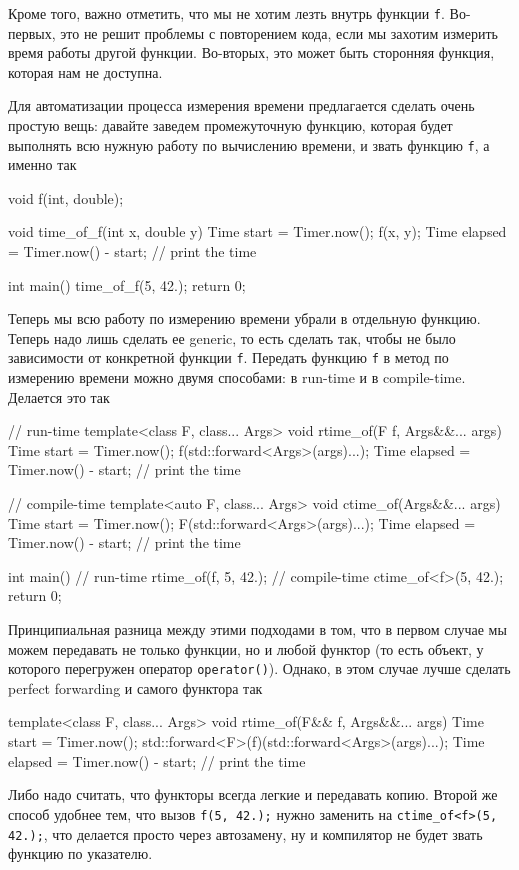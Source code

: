 Кроме того, важно отметить, что мы не хотим лезть внутрь функции \verb"f".
Во-первых, это не решит проблемы с повторением кода, если мы захотим измерить время работы другой функции.
Во-вторых, это может быть сторонняя функция, которая нам не доступна.

Для автоматизации процесса измерения времени предлагается сделать очень простую вещь: давайте заведем промежуточную функцию, которая будет выполнять всю нужную работу по вычислению времени, и звать функцию \verb"f", а именно так
\begin{cppcode}
void f(int, double);

void time_of_f(int x, double y) {
  Time start = Timer.now();
  f(x, y);
  Time elapsed = Timer.now() - start;
  // print the time
}

int main() {
  time_of_f(5, 42.);
  return 0;
}
\end{cppcode}
Теперь мы всю работу по измерению времени убрали в отдельную функцию.
Теперь надо лишь сделать ее generic, то есть сделать так, чтобы не было зависимости от конкретной функции \verb"f".
Передать функцию \verb"f" в метод по измерению времени можно двумя способами: в run-time и в compile-time.
Делается это так
\begin{cppcode}
// run-time
template<class F, class... Args>
void rtime_of(F f, Args&&... args) {
  Time start = Timer.now();
  f(std::forward<Args>(args)...);
  Time elapsed = Timer.now() - start;
  // print the time
}

// compile-time
template<auto F, class... Args>
void ctime_of(Args&&... args) {
  Time start = Timer.now();
  F(std::forward<Args>(args)...);
  Time elapsed = Timer.now() - start;
  // print the time
}

int main() {
  // run-time
  rtime_of(f, 5, 42.);
  // compile-time
  ctime_of<f>(5, 42.);
  return 0;
}
\end{cppcode}
Принципиальная разница между этими подходами в том, что в первом случае мы можем передавать не только функции, но и любой функтор (то есть объект, у которого перегружен оператор \verb"operator()").
Однако, в этом случае лучше сделать perfect forwarding и самого функтора так
\begin{cppcode}
template<class F, class... Args>
void rtime_of(F&& f, Args&&... args) {
  Time start = Timer.now();
  std::forward<F>(f)(std::forward<Args>(args)...);
  Time elapsed = Timer.now() - start;
  // print the time
}
\end{cppcode}
Либо надо считать, что функторы всегда легкие и передавать копию.
Второй же способ удобнее тем, что вызов \verb"f(5, 42.);" нужно заменить на \verb"ctime_of<f>(5, 42.);", что делается просто через автозамену, ну и компилятор не будет звать функцию по указателю.

